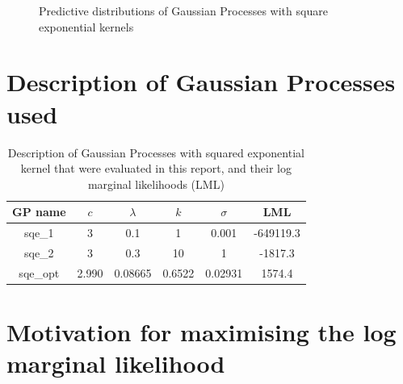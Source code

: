 \documentclass{article}
\begin{document}

\begin{figure}[pht]
    \centering
    \caption{Predictive distributions of Gaussian Processes with square exponential kernels}
    \label{fig:pred_samples}
\end{figure}


\section{Description of Gaussian Processes used}\label{appendix:gp_table}


\begin{table}[ht]
\centering
\begin{tabular}{|c|c|c|c|c|c|}
\hline
GP name  & $c$   & $\lambda$ & $k$    & $\sigma$ & LML       \\
\hline
sqe\_1   & 3     & 0.1       & 1      & 0.001    & -649119.3 \\
sqe\_2   & 3     & 0.3       & 10     & 1        & -1817.3   \\
sqe\_opt & 2.990 & 0.08665   & 0.6522 & 0.02931  & 1574.4    \\
\hline
\end{tabular}
\caption{Description of Gaussian Processes with squared exponential kernel that were evaluated in this report, and their log marginal likelihoods (LML)}
\label{table:sqe_table}
\end{table}


\section{Motivation for maximising the log marginal likelihood}\label{appendix:why_lml}




\end{document}
